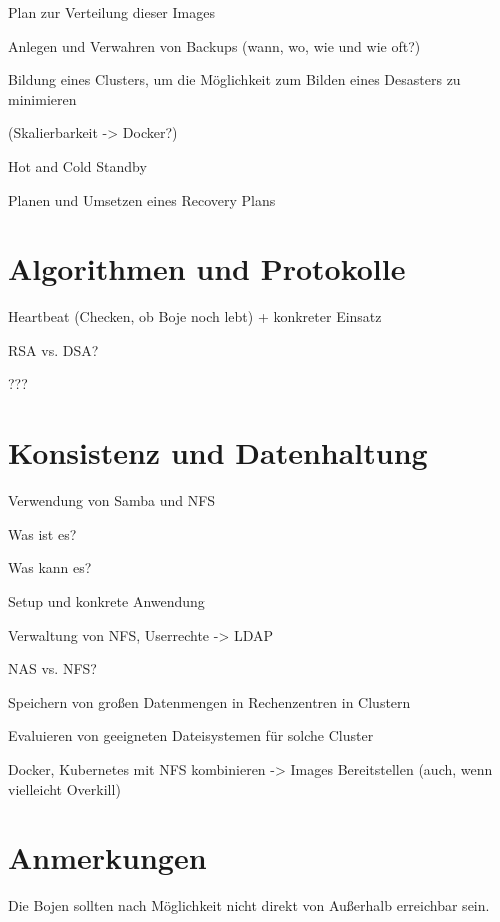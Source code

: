 Plan zur Verteilung dieser Images

Anlegen und Verwahren von Backups (wann, wo, wie und wie oft?)

Bildung eines Clusters, um die Möglichkeit zum Bilden eines Desasters zu minimieren

(Skalierbarkeit -> Docker?)

Hot and Cold Standby

Planen und Umsetzen eines Recovery Plans


\section{Algorithmen und Protokolle}
\label{sec:Algorithmen und Protokolle}
Heartbeat (Checken, ob Boje noch lebt) +  konkreter Einsatz

RSA vs. DSA?

???



\section{Konsistenz und Datenhaltung}
\label{sec:Konsistenz und Datenhaltung}
Verwendung von Samba und NFS

Was ist es?

Was kann es?

Setup und konkrete Anwendung

Verwaltung von NFS, Userrechte -> LDAP

NAS vs. NFS?

Speichern von großen Datenmengen in Rechenzentren in Clustern

Evaluieren von geeigneten Dateisystemen für solche Cluster

Docker, Kubernetes mit NFS kombinieren -> Images Bereitstellen (auch, wenn vielleicht Overkill)


\section{Anmerkungen}
\label{sec:Anmerkungen}
Die Bojen sollten nach Möglichkeit nicht direkt von Außerhalb erreichbar sein.



%
